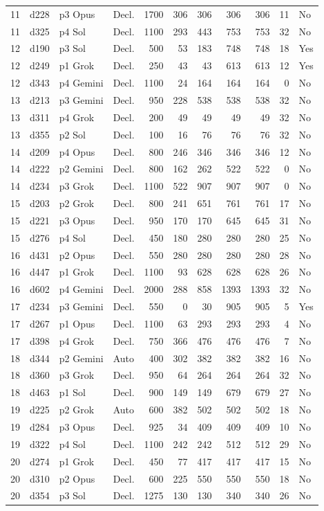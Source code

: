 \begin{longtable}{r l l l r r r r r r l}
11 & d228 & p3 Opus & Decl. & 1700 & 306 & 306 & 306 & 306 & 11 & No \\
11 & d325 & p4 Sol & Decl. & 1100 & 293 & 443 & 753 & 753 & 32 & No \\
12 & d190 & p3 Sol & Decl. & 500 & 53 & 183 & 748 & 748 & 18 & Yes \\
12 & d249 & p1 Grok & Decl. & 250 & 43 & 43 & 613 & 613 & 12 & Yes \\
12 & d343 & p4 Gemini & Decl. & 1100 & 24 & 164 & 164 & 164 & 0 & No \\
13 & d213 & p3 Gemini & Decl. & 950 & 228 & 538 & 538 & 538 & 32 & No \\
13 & d311 & p4 Grok & Decl. & 200 & 49 & 49 & 49 & 49 & 32 & No \\
13 & d355 & p2 Sol & Decl. & 100 & 16 & 76 & 76 & 76 & 32 & No \\
14 & d209 & p4 Opus & Decl. & 800 & 246 & 346 & 346 & 346 & 12 & No \\
14 & d222 & p2 Gemini & Decl. & 800 & 162 & 262 & 522 & 522 & 0 & No \\
14 & d234 & p3 Grok & Decl. & 1100 & 522 & 907 & 907 & 907 & 0 & No \\
15 & d203 & p2 Grok & Decl. & 800 & 241 & 651 & 761 & 761 & 17 & No \\
15 & d221 & p3 Opus & Decl. & 950 & 170 & 170 & 645 & 645 & 31 & No \\
15 & d276 & p4 Sol & Decl. & 450 & 180 & 280 & 280 & 280 & 25 & No \\
16 & d431 & p2 Opus & Decl. & 550 & 280 & 280 & 280 & 280 & 28 & No \\
16 & d447 & p1 Grok & Decl. & 1100 & 93 & 628 & 628 & 628 & 26 & No \\
16 & d602 & p4 Gemini & Decl. & 2000 & 288 & 858 & 1393 & 1393 & 32 & No \\
17 & d234 & p3 Gemini & Decl. & 550 & 0 & 30 & 905 & 905 & 5 & Yes \\
17 & d267 & p1 Opus & Decl. & 1100 & 63 & 293 & 293 & 293 & 4 & No \\
17 & d398 & p4 Grok & Decl. & 750 & 366 & 476 & 476 & 476 & 7 & No \\
18 & d344 & p2 Gemini & Auto & 400 & 302 & 382 & 382 & 382 & 16 & No \\
18 & d360 & p3 Grok & Decl. & 950 & 64 & 264 & 264 & 264 & 32 & No \\
18 & d463 & p1 Sol & Decl. & 900 & 149 & 149 & 679 & 679 & 27 & No \\
19 & d225 & p2 Grok & Auto & 600 & 382 & 502 & 502 & 502 & 18 & No \\
19 & d284 & p3 Opus & Decl. & 925 & 34 & 409 & 409 & 409 & 10 & No \\
19 & d322 & p4 Sol & Decl. & 1100 & 242 & 242 & 512 & 512 & 29 & No \\
20 & d274 & p1 Grok & Decl. & 450 & 77 & 417 & 417 & 417 & 15 & No \\
20 & d310 & p2 Opus & Decl. & 600 & 225 & 550 & 550 & 550 & 18 & No \\
20 & d354 & p3 Sol & Decl. & 1275 & 130 & 130 & 340 & 340 & 26 & No \\
\end{longtable}
